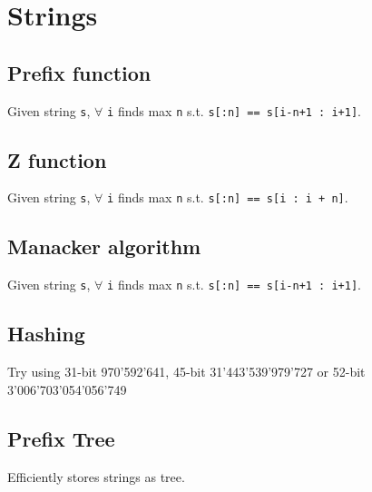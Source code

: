 \section{Strings}

\subsection{Prefix function}
Given string \verb|s|, $\forall$ \verb|i| finds max \verb|n| s.t. \verb|s[:n] == s[i-n+1 : i+1]|.

\subsection{Z function}
Given string \verb|s|, $\forall$ \verb|i| finds max \verb|n| s.t. \verb|s[:n] == s[i : i + n]|.

\subsection{Manacker algorithm}
Given string \verb|s|, $\forall$ \verb|i| finds max \verb|n| s.t. \verb|s[:n] == s[i-n+1 : i+1]|.

\subsection{Hashing}
Try using 31-bit 970'592'641, 45-bit 31'443'539'979'727 or 52-bit 3'006'703'054'056'749

\subsection{Prefix Tree}

Efficiently stores strings as tree.


